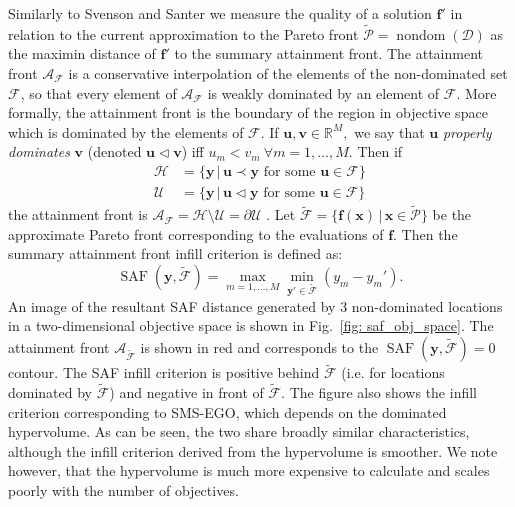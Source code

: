 \documentclass[conference]{IEEEtran}
\makeatletter
\newcommand{\paretofront}{\mathcal{F}}
\newcommand{\attainmentfront}{\mathcal{A}}
\newcommand{\nobj}{M}
\DeclareMathOperator*{\saf}{SAF}
\DeclareMathOperator{\nondom}{nondom}
\newcommand\Papprox{\tilde{\mathcal{P}}}
\newcommand\Fapprox{\tilde{\mathcal{F}}}
\newcommand{\reals}{\mathbb{R}}
\newcommand{\given}{\,|\,}
\newcommand{\bx}{\mathbf{x}}
\newcommand{\bu}{\mathbf{u}}
\newcommand{\bv}{\mathbf{v}}
\newcommand{\by}{\mathbf{y}}
\newcommand{\bff}{\mathbf{f}}
\newcommand{\data}{\mathcal{D}}
\newcommand*{\ie}{i.e.\@\xspace}
\makeatother
\begin{document}
Similarly to Svenson and
Santer \cite{svenson2016multiobjective}  we measure the quality of a solution $\bff'$ in relation to the current approximation to the Pareto front $ \Papprox = \nondom( \data )$ as the maximin distance of $\bff'$ to the summary attainment front.  The attainment front $\attainmentfront_{\mathcal{F}}$ is a conservative interpolation of the elements of the non-dominated set $\mathcal{F}$, so that every element of $\attainmentfront_{\mathcal{F}}$ is weakly dominated by an element of $\mathcal{F}$. More formally, the attainment front is the boundary of the region in objective space which is dominated by the elements of $\mathcal{F}$.  If
$\bu, \bv \in \reals^\nobj,$ we say that $\bu$ \textit{properly dominates} $\bv$
(denoted $\bu \lhd \bv$) iff $u_m < v_m ~\forall m = 1,\ldots, \nobj$.  Then if
\begin{align}
  \label{eq:FandU}
  \mathcal{H} &= \{\by \given \bu \prec \by \text{ for some } \bu\in \mathcal{F}\}\\
  \mathcal{U} &= \{\by \given \bu \lhd \by \text{ for some } \bu\in \mathcal{F} \}
\end{align}
the attainment front is $\attainmentfront_{\mathcal{F}} = \mathcal{H}\setminus\mathcal{U}=\partial\mathcal{U}$ \cite{smith2004dominance}.   Let $\Fapprox = \{ \bff(\bx) \given \bx \in \Papprox \}$ be the approximate Pareto front corresponding to the evaluations of $\bff$.   Then the summary attainment front infill criterion is defined as:
\begin{equation}\label{eqn: SAF}
  \saf(\by, \Fapprox) =
  \max_{m=1,\ldots, \nobj} \min_{\by' \in \Fapprox } 
  \left(
    y_m - y_m'
  \right).
\end{equation}
An image of the resultant SAF  distance generated by 3 non-dominated locations  in a two-dimensional  objective space is shown in Fig.~\ref{fig: saf_obj_space}. The attainment front $\attainmentfront_{\Fapprox}$ is shown in red and corresponds to the $\saf(\by, \Fapprox) = 0$ contour. The SAF infill criterion is positive behind $ \Fapprox$ (\ie for locations dominated by $\Fapprox$) and negative in front of $\Fapprox$. The figure also shows the infill criterion corresponding to SMS-EGO, which depends on the dominated hypervolume. As can be seen, the two share broadly similar characteristics, although the infill criterion derived from the hypervolume is smoother.  We note however, that the hypervolume is much more expensive to calculate and scales poorly with the number of objectives. 
 

\end{document}
